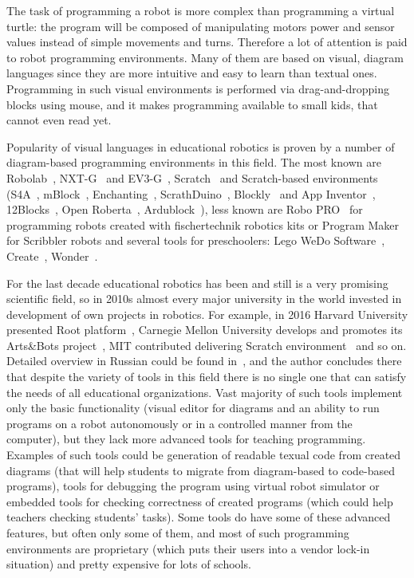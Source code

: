 \documentclass[conference]{IEEEtran}
\begin{document}
The task of programming a robot is more complex than programming a virtual turtle: the program will be composed of manipulating motors power and sensor values instead of simple movements and turns. Therefore a lot of attention is paid to robot programming environments. Many of them are based on visual, diagram languages since they are more intuitive and easy to learn than textual ones. Programming in such visual environments is performed via drag-and-dropping blocks using mouse, and it makes programming available to small kids, that cannot even read yet. 

Popularity of visual languages in educational robotics is proven by a number of diagram-based programming environments in this field. The most known are Robolab~\cite{erwin2000lego}, NXT-G~\cite{kelly2010lego} and EV3-G~\cite{valk2014lego}, Scratch~\cite{resnick2009scratch} and Scratch-based environments (S4A~\cite{s4a}, mBlock~\cite{mblock}, Enchanting~\cite{enchanting}, ScrathDuino~\cite{scratchduino}, Blockly~\cite{blockly} and App Inventor~\cite{wolber2011app}, 12Blocks~\cite{12blocks}, Open Roberta~\cite{jost2014graphical}, Ardublock~\cite{ardublock}), less known are Robo PRO~\cite{chang2006incorporating} for programming robots created with fischertechnik robotics kits or Program Maker for Scribbler robots and several tools for preschoolers: Lego WeDo Software~\cite{mayerova2012pilot}, Create~\cite{cross2013visual}, Wonder~\cite{wonder}. 

For the last decade educational robotics has been and still is a very promising scientific field, so in 2010s almost every major university in the world invested in development of own projects in robotics. For example, in 2016 Harvard University presented Root platform~\cite{root}, Carnegie Mellon University develops and promotes its Arts\&Bots project~\cite{cross2013visual}, MIT contributed delivering Scratch environment~\cite{resnick2009scratch} and so on. Detailed overview in Russian could be found in~\cite{mordvinov2016NONPUBLISHED}, and the author concludes there that despite the variety of tools in this field there is no single one that can satisfy the needs of all educational organizations. Vast majority of such tools implement only the basic functionality (visual editor for diagrams and an ability to run programs on a robot autonomously or in a controlled manner from the computer), but they lack more advanced tools for teaching programming. Examples of such tools could be generation of readable texual code from created diagrams (that will help students to migrate from diagram-based to code-based programs), tools for debugging the program using virtual robot simulator or embedded tools for checking correctness of created programs (which could help teachers checking students' tasks). Some tools do have some of these advanced features, but often only some of them, and most of such programming environments are proprietary (which puts their users into a vendor lock-in situation) and pretty expensive for lots of schools.
\end{document}
